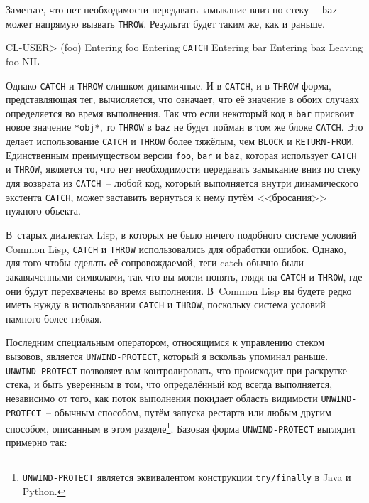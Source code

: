 Заметьте, что нет необходимости передавать замыкание вниз по стеку~-- \lstinline{baz} может
напрямую вызвать \lstinline{THROW}.  Результат будет таким же, как и раньше.

\begin{myverb}
  CL-USER> (foo)
  Entering foo
   Entering \lstinline{CATCH}
    Entering bar
     Entering baz
  Leaving foo
  NIL
\end{myverb}

Однако \lstinline{CATCH} и \lstinline{THROW} слишком динамичные.  И в \lstinline{CATCH}, и в
\lstinline{THROW} форма, предс\-тав\-ляю\-щая тег, вычисляется, что означает, что её значение в
обоих случаях определяется во время выполнения.  Так что если некоторый код в \lstinline{bar}
присвоит новое значение \lstinline{*obj*}, то \lstinline{THROW} в \lstinline{baz} не будет пойман в том
же блоке \lstinline{CATCH}.  Это делает использование \lstinline{CATCH} и \lstinline{THROW} более тяжёлым,
чем \lstinline{BLOCK} и \lstinline{RETURN-FROM}. Единственным преимуществом версии \lstinline{foo},
\lstinline{bar} и \lstinline{baz}, которая использует \lstinline{CATCH} и \lstinline{THROW}, является то, что
нет необходимости передавать замыкание вниз по стеку для возврата из \lstinline{CATCH}~--
любой код, который выполняется внутри динамического экстента \lstinline{CATCH}, может заставить
вернуться к нему путём <<бросания>>  нужного объекта.

В~старых диалектах Lisp, в которых не было ничего подобного системе условий Common Lisp,
\lstinline{CATCH} и \lstinline{THROW} использовались для обработки ошибок.  Однако, для того чтобы
сделать её сопровождаемой, теги catch обычно были закавыченными символами, так что вы могли
понять, глядя на \lstinline{CATCH} и \lstinline{THROW}, где они будут перехвачены во время
выполнения. В~Common Lisp вы будете редко иметь нужду в использовании \lstinline{CATCH} и
\lstinline{THROW}, поскольку система условий намного более гибкая.

Последним специальным оператором, относящимся к управлению стеком вызовов, является
\lstinline{UNWIND-PROTECT}, который я вскользь упоминал раньше. \lstinline{UNWIND-PROTECT} позволяет
вам контролировать, что происходит при раскрутке стека, и быть уверенным в том, что
определённый код всегда выполняется, независимо от того, как поток выполнения покидает
область видимости \lstinline{UNWIND-PROTECT}~-- обычным способом, путём запуска рестарта или
любым другим способом, описанным в этом разделе\footnote{\lstinline{UNWIND-PROTECT} является
  эквивалентом конструкции \lstinline{try/finally} в Java и Python.}\hspace{\footnotenegspace}.  Базовая форма
\lstinline{UNWIND-PROTECT} выглядит примерно так:

